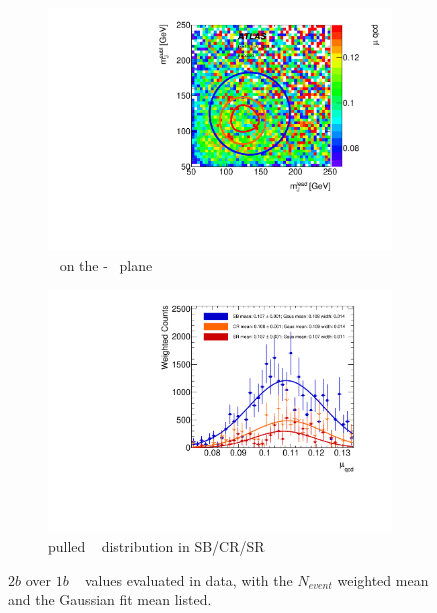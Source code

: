 \begin{figure}[htb!]
\centering
\captionsetup{justification=centering}
	\hspace{-1cm}
    \begin{subfigure}[b]{0.4\textwidth}
        \includegraphics[width=\textwidth,angle=-90]{figures/boosted/AppendixMuqcdstudy/TwoTag_Incl_mH0H1.pdf}
        \caption{\muqcd~ on the \mleadJ-\msublJ~ plane}
        \label{fig:app-muqcd-2b-2d}
    \end{subfigure}
    \quad \quad \quad \quad 
    \begin{subfigure}[b]{0.4\textwidth}
        \includegraphics[width=\textwidth,angle=-90]{figures/boosted/AppendixMuqcdstudy/TwoTag_Incl_mH0H1_pull.pdf}
        \caption{pulled \muqcd~ distribution in SB/CR/SR}
        \label{fig:app-muqcd-2b-pull}
    \end{subfigure}
\caption{$2b$ over $1b$ \muqcd~ values evaluated in data, with the $N_{event}$ weighted mean and the Gaussian fit mean listed.}
\label{fig:app-muqcd-2b}
\end{figure}

